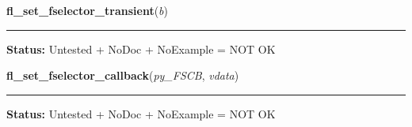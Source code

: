     \label{xformslib:library:fl_set_fselector_transient}

    \vspace{0.5ex}

\hspace{.8\funcindent}\begin{boxedminipage}{\funcwidth}

    \raggedright \textbf{fl\_set\_fselector\_transient}(\textit{b})

    \vspace{-1.5ex}

    \rule{\textwidth}{0.5\fboxrule}
\setlength{\parskip}{2ex}
\setlength{\parskip}{1ex}
\textbf{Status:} Untested + NoDoc + NoExample = NOT OK



    \end{boxedminipage}

    \label{xformslib:library:fl_set_fselector_callback}

    \vspace{0.5ex}

\hspace{.8\funcindent}\begin{boxedminipage}{\funcwidth}

    \raggedright \textbf{fl\_set\_fselector\_callback}(\textit{py\_FSCB}, \textit{vdata})

    \vspace{-1.5ex}

    \rule{\textwidth}{0.5\fboxrule}
\setlength{\parskip}{2ex}
\setlength{\parskip}{1ex}
\textbf{Status:} Untested + NoDoc + NoExample = NOT OK



    \end{boxedminipage}

    \label{xformslib:library:fl_get_filename}

    \vspace{0.5ex}

